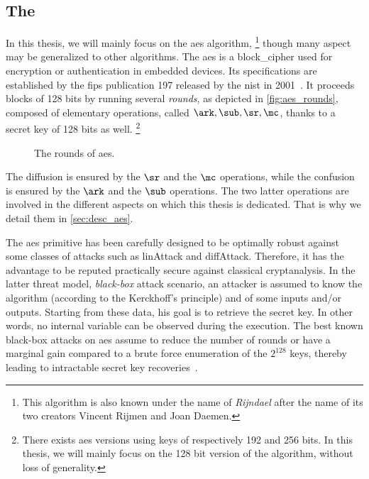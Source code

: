 \subsection{The }
\label{sec:intro_aes}
In this thesis, we will mainly focus on the \gls{aes} algorithm,%
\footnote{
	This algorithm is also known under the name of \emph{Rijndael} after the name of its two creators Vincent Rijmen and Joan Daemen.
}
though many aspect may be generalized to other algorithms.
The \gls{aes} is a \gls{block_cipher} used for encryption or authentication in embedded devices.
Its specifications are established by the \gls{fips} publication 197 released by the \gls{nist} in 2001~\cite{nist_2001}.
It proceeds blocks of 128 bits by running several \emph{rounds}, as depicted in \autoref{fig:aes_rounds}, composed of elementary operations, called \(\ark, \sub, \sr, \mc\), thanks to a secret key of 128 bits as well.%
\footnote{
	There exists \gls{aes} versions using keys of respectively 192 and 256 bits.
	In this thesis, we will mainly focus on the 128 bit version of the algorithm, without loss of generality.
}
\begin{figure}
	\centering
	
	\caption{The rounds of \gls{aes}.}
	\label{fig:aes_rounds}
\end{figure}
The \gls{diffusion} is ensured by the \(\sr\) and the \(\mc\) operations, while the \gls{confusion} is ensured by the \(\ark\) and the \(\sub\) operations.
The two latter operations are involved in the different aspects on which this thesis is dedicated.
That is why we detail them in \autoref{sec:desc_aes}.

The \gls{aes} \gls{primitive} has been carefully designed to be optimally robust against some classes of attacks such as \gls{linAttack} and \gls{diffAttack}.
Therefore, it has the advantage to be reputed practically secure against classical cryptanalysis.
In the latter threat model, \aka{} \emph{black-box} attack scenario, an attacker is assumed to know the algorithm (according to the Kerckhoff's principle) and of some inputs and/or outputs.
Starting from these data, his goal is to retrieve the secret key.
In other words, no internal variable can be observed during the execution.
The best known black-box attacks on \gls{aes} assume to reduce the number of rounds or have a marginal gain compared to a brute force enumeration of the \(2^{128}\) keys, thereby leading to intractable secret key recoveries~\cite{bogdanov_biclique_2011}.

